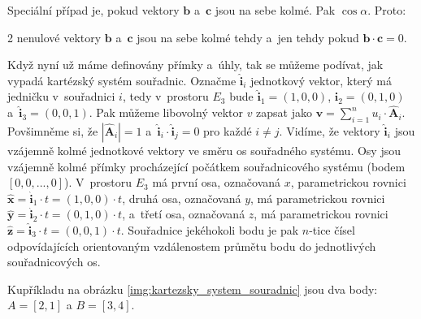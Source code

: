 \documentclass{book}
\newcommand{\vect}[1]{\boldsymbol{#1}}
\newcommand{\unitvect}[1]{\hat{\boldsymbol{#1}}}
\begin{document}
Speciální případ je, pokud vektory \(\vect{b}\) a~\(\vect{c}\) jsou na sebe kolmé. Pak \(\cos \alpha\). Proto:

\begin{fact}
2 nenulové vektory \(\vect{b}\) a~\(\vect{c}\) jsou na sebe kolmé tehdy a~jen tehdy pokud \(\vect{b} \cdot \vect{c} = 0\).
\end{fact}

Když nyní už máme definovány přímky a~úhly, tak se můžeme podívat, jak vypadá kartézský systém souřadnic. Označme \(\unitvect{i}_i\) jednotkový vektor, který má jedničku v~souřadnici \(i\), tedy v~prostoru \(E_3\) bude \(\unitvect{i}_1 = (1, 0, 0)\), \(\unitvect{i}_2 = (0, 1, 0)\) a~\(\unitvect{i}_3 = (0, 0, 1)\). Pak můžeme libovolný vektor \(v\) zapsat jako \(\vect{v} = \sum_{i=1}^n u_i \cdot \unitvect{A}_i\). Povšimněme si, že \(|\unitvect{A}_i| = 1\) a~\(\unitvect{i}_i \cdot \unitvect{i}_j = 0\) pro každé \(i \neq j\). Vidíme, že vektory \(\unitvect{i}_i\) jsou vzájemně kolmé jednotkové vektory ve směru os souřadného systému.
Osy jsou vzájemně kolmé přímky procházející počátkem souřadnicového systému (bodem \([0, 0, ..., 0]\)). V~prostoru \(E_3\) má první osa, označovaná \(x\), parametrickou rovnici \(\unitvect{x} = \unitvect{i}_1 \cdot t = (1, 0, 0) \cdot t\), druhá osa, označovaná \(y\), má parametrickou rovnici \(\unitvect{y} = \unitvect{i}_2 \cdot t = (0, 1, 0) \cdot t\), a~třetí osa, označovaná \(z\), má parametrickou rovnici \(\unitvect{z} = \unitvect{i}_3 \cdot t = (0, 0, 1) \cdot t\).
Souřadnice jekéhokoli bodu je pak \(n\)-tice čísel odpovídajících orientovaným vzdálenostem průmětu bodu do jednotlivých souřadnicových os.

Kupříkladu na obrázku \ref{img:kartezsky_system_souradnic} jsou dva body: \(A = [2, 1]\) a \(B = [3, 4]\).

\end{document}
